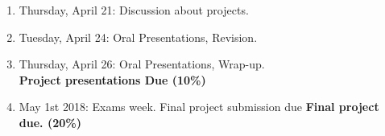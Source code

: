 \documentclass[11pt,a4paper]{article}
\begin{document}
\begin{enumerate}
  \item Thursday, April 21: Discussion about projects.

  \item Tuesday, April 24: Oral Presentations, Revision.

  \item Thursday, April 26: Oral Presentations, Wrap-up.
  \\ \textbf{Project presentations Due (10\%)}
  
  \item May 1st 2018: Exams week. Final project submission due
   \textbf{Final project due. (20\%)}

\end{enumerate}
\end{document}
